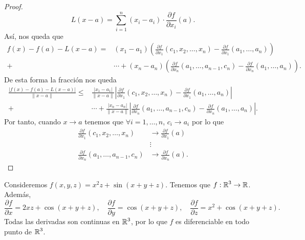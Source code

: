 \begin{proof}
\[L\left(x-a\right) = \sum^{n}_{i = 1}\left(x_{i}-a_{i}\right) \cdot \frac{\partial f}{\partial x_{i}}\left(a\right) .\]
Así, nos queda que
\[
\begin{split}
	 f\left(x\right)-f\left(a\right) - L\left(x-a\right) 
	 = & \left(x_{1}-a_{1}\right) \left(\frac{\partial f}{\partial x_{1}}\left(c_{1}, x_{2}, \ldots, x_{n}\right)-\frac{\partial f}{\partial x_{1}}\left(a_{1}, \ldots, a_{n}\right)\right) \\
	+ &  \cdots + \left(x_{n}-a_{n}\right)\left(\frac{\partial f}{\partial x_{n}}\left(a_{1}, \ldots, a_{n-1}, c_{n}\right)-\frac{\partial f}{\partial x_{n}}\left(a_{1}, \ldots, a_{n}\right)\right) .
\end{split}
\]
De esta forma la fracción nos queda
\[
\begin{split}
	\frac{ \left|f\left(x\right)-f\left(a\right)-L\left(x-a\right)\right|}{ \|x-a\|} \leq & \frac{ \left|x_{1}-a_{1}\right|}{\|x-a\|} \left|\frac{\partial f}{\partial x_{1}}\left(c_{1}, x_{2}, \ldots, x_{n}\right)-\frac{\partial f}{\partial x_{1}}\left(a_{1}, \ldots, a_{n}\right)\right| \\
	+ & \cdots + \frac{ \left|x_{n}-a_{n}\right|}{\|x-a\|} \left|\frac{\partial f}{\partial x_{n}}\left(a_{1}, \ldots, a_{n-1}, c_{n}\right)-\frac{\partial f}{\partial x_{n}}\left(a_{1}, \ldots, a_{n}\right)\right|.
\end{split}
\]
Por tanto, cuando $\displaystyle x \to a $ tenemos que $\displaystyle \forall i = 1, \ldots, n $, $\displaystyle c_{i} \to a_{i} $ por lo que 
\[
\begin{split}
	\frac{\partial f}{\partial x_{1}}\left(c_{1}, x_{2}, \ldots, x_{n}\right) & \to \frac{\partial f}{\partial x_{1}}\left(a\right) \\
& \vdots \\
	\frac{\partial f}{\partial x_{n}}\left(a_{1}, \ldots, a_{n-1}, c_{n}\right) & \to \frac{\partial f}{\partial x_{n}}\left(a\right).
\end{split}
\]
\end{proof}
\begin{eg}
Consideremos $\displaystyle f\left(x,y,z\right) = x^{2}z + \sin\left(x+y+z\right) $. Tenemos que $\displaystyle f : \mathbb{R}^{3} \to \mathbb{R} $. Además, 
\[\frac{\partial f}{\partial x} = 2xz + \cos\left(x+y+z\right), \quad \frac{\partial f}{\partial y}= \cos\left(x+y+z\right), \quad \frac{\partial f}{\partial z} = x^{2} + \cos\left(x+y+z\right) .\]
Todas las derivadas son continuas en $\displaystyle \mathbb{R}^{3} $, por lo que $\displaystyle f $ es diferenciable en todo punto de $\displaystyle \mathbb{R}^{3} $. 
\end{eg}

